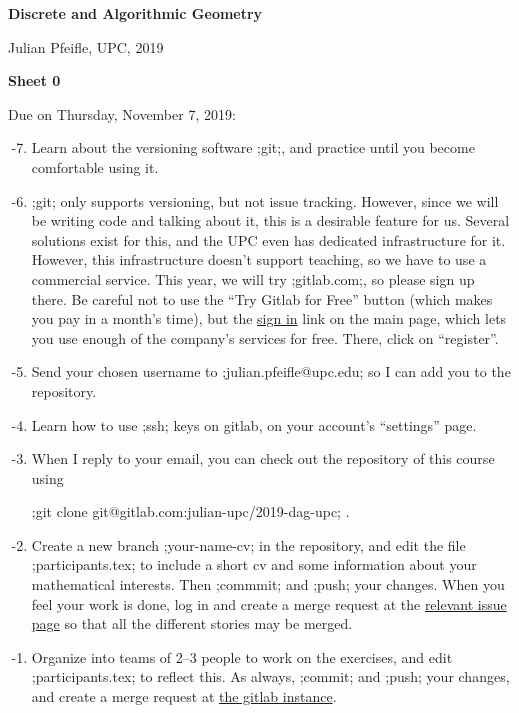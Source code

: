 \documentclass[11pt]{amsart}
\begin{document}
\begin{center}
\textbf{\sffamily
   Discrete and Algorithmic Geometry }

 \bigskip
 Julian Pfeifle,
   UPC, 2019

   \bigskip
   \textbf{\sffamily Sheet 0}
 \end{center}

  \bigskip\bigskip
 \begin{center}
  \color{blue}Due on Thursday, November 7, 2019:
\end{center}


\begin{enumerate}
  \setcounter{enumi}{-8}
\item
  Learn about the versioning software ;git;, and practice until you become comfortable using it.

\item
  ;git; only supports versioning, but not issue tracking.
  However, since we will be writing code and talking about it, this is a desirable feature for us.
  Several solutions exist for this, and the UPC even has dedicated infrastructure for it.
  However, this infrastructure doesn't support teaching, so we have to use a commercial service.
  This year, we will try ;gitlab.com;, so please sign up there.
  Be careful not to use the ``Try Gitlab for Free'' button (which makes you pay in a month's time), but the 
  \href{https://gitlab.com/users/sign_in}{sign in} link on the main page, which lets you use enough of the company's services for free.
  There, click on ``register''.

\item
  Send your chosen username to ;julian.pfeifle@upc.edu; so I can add you to the repository.

\item
  Learn how to use ;ssh; keys on gitlab, on your account's ``settings'' page.
  
\item
  When I reply to your email, you can check out the repository of this course using
  \begin{center}
    ;git clone git@gitlab.com:julian-upc/2019-dag-upc; .
  \end{center}

  \medskip
\item
  Create a new branch ;your-name-cv; in the repository, and edit the file ;participants.tex; to include a short cv and some information about your mathematical interests.
  Then ;commmit; and ;push; your changes. When you feel your work is done, log in and create a merge request at the \href{https://gitlab.com/julian-upc/2019-dag-upc/issues/1}{relevant issue page} so that all the different stories may be merged.
  
  \medskip
\item
  Organize into teams of 2--3 people to work on the exercises, and
  edit  ;participants.tex; to reflect this.
  As always, ;commit; and ;push; your changes, and create a merge request at \href{https://gitlab.com/julian-upc/2019-dag-upc/issues/1}{the gitlab instance}.
\end{enumerate}
\end{document}
